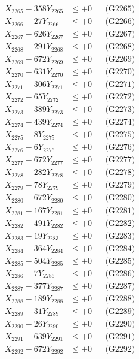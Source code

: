\documentclass[a4paper,10pt]{article}
\begin{document}
{\begin{align}
X_{2265} - 358Y_{2265} &\leq +0 && \text{(G2265)} \\
X_{2266} - 27Y_{2266} &\leq +0 && \text{(G2266)} \\
X_{2267} - 626Y_{2267} &\leq +0 && \text{(G2267)} \\
X_{2268} - 291Y_{2268} &\leq +0 && \text{(G2268)} \\
X_{2269} - 672Y_{2269} &\leq +0 && \text{(G2269)} \\
X_{2270} - 631Y_{2270} &\leq +0 && \text{(G2270)} \\
\allowbreak
X_{2271} - 306Y_{2271} &\leq +0 && \text{(G2271)} \\
X_{2272} - 65Y_{2272} &\leq +0 && \text{(G2272)} \\
X_{2273} - 389Y_{2273} &\leq +0 && \text{(G2273)} \\
X_{2274} - 439Y_{2274} &\leq +0 && \text{(G2274)} \\
X_{2275} - 8Y_{2275} &\leq +0 && \text{(G2275)} \\
X_{2276} - 6Y_{2276} &\leq +0 && \text{(G2276)} \\
X_{2277} - 672Y_{2277} &\leq +0 && \text{(G2277)} \\
X_{2278} - 282Y_{2278} &\leq +0 && \text{(G2278)} \\
X_{2279} - 78Y_{2279} &\leq +0 && \text{(G2279)} \\
X_{2280} - 672Y_{2280} &\leq +0 && \text{(G2280)} \\
\allowbreak
X_{2281} - 167Y_{2281} &\leq +0 && \text{(G2281)} \\
X_{2282} - 491Y_{2282} &\leq +0 && \text{(G2282)} \\
X_{2283} - 19Y_{2283} &\leq +0 && \text{(G2283)} \\
X_{2284} - 364Y_{2284} &\leq +0 && \text{(G2284)} \\
X_{2285} - 504Y_{2285} &\leq +0 && \text{(G2285)} \\
X_{2286} - 7Y_{2286} &\leq +0 && \text{(G2286)} \\
X_{2287} - 377Y_{2287} &\leq +0 && \text{(G2287)} \\
X_{2288} - 189Y_{2288} &\leq +0 && \text{(G2288)} \\
X_{2289} - 31Y_{2289} &\leq +0 && \text{(G2289)} \\
X_{2290} - 26Y_{2290} &\leq +0 && \text{(G2290)} \\
\allowbreak
X_{2291} - 639Y_{2291} &\leq +0 && \text{(G2291)} \\
X_{2292} - 672Y_{2292} &\leq +0 && \text{(G2292)} \\

\end{align}}
\end{document}
